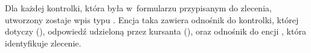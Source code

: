 \medskip
Dla każdej kontrolki, która była w~formularzu przypisanym do zlecenia, utworzony zostaje wpis typu . Encja taka zawiera odnośnik do kontrolki, której dotyczy (), odpowiedź udzieloną przez kursanta (), oraz odnośnik do encji , która identyfikuje zlecenie.

